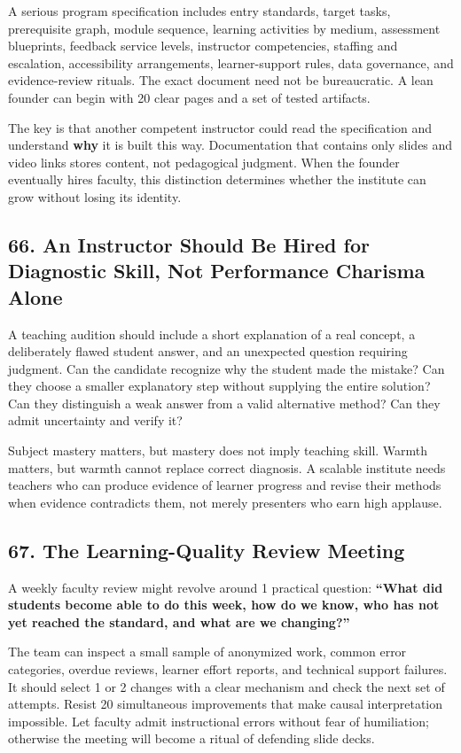 A serious program specification includes entry standards, target tasks, prerequisite graph, module sequence, learning activities by medium, assessment blueprints, feedback service levels, instructor competencies, staffing and escalation, accessibility arrangements, learner-support rules, data governance, and evidence-review rituals. The exact document need not be bureaucratic. A lean founder can begin with 20 clear pages and a set of tested artifacts.

The key is that another competent instructor could read the specification and understand \textbf{why} it is built this way. Documentation that contains only slides and video links stores content, not pedagogical judgment. When the founder eventually hires faculty, this distinction determines whether the institute can grow without losing its identity.

\subsection*{66. An Instructor Should Be Hired for Diagnostic Skill, Not Performance Charisma Alone}

A teaching audition should include a short explanation of a real concept, a deliberately flawed student answer, and an unexpected question requiring judgment. Can the candidate recognize why the student made the mistake? Can they choose a smaller explanatory step without supplying the entire solution? Can they distinguish a weak answer from a valid alternative method? Can they admit uncertainty and verify it?

Subject mastery matters, but mastery does not imply teaching skill. Warmth matters, but warmth cannot replace correct diagnosis. A scalable institute needs teachers who can produce evidence of learner progress and revise their methods when evidence contradicts them, not merely presenters who earn high applause.

\subsection*{67. The Learning-Quality Review Meeting}

A weekly faculty review might revolve around 1 practical question: \textbf{``What did students become able to do this week, how do we know, who has not yet reached the standard, and what are we changing?''}

The team can inspect a small sample of anonymized work, common error categories, overdue reviews, learner effort reports, and technical support failures. It should select 1 or 2 changes with a clear mechanism and check the next set of attempts. Resist 20 simultaneous improvements that make causal interpretation impossible. Let faculty admit instructional errors without fear of humiliation; otherwise the meeting will become a ritual of defending slide decks.

